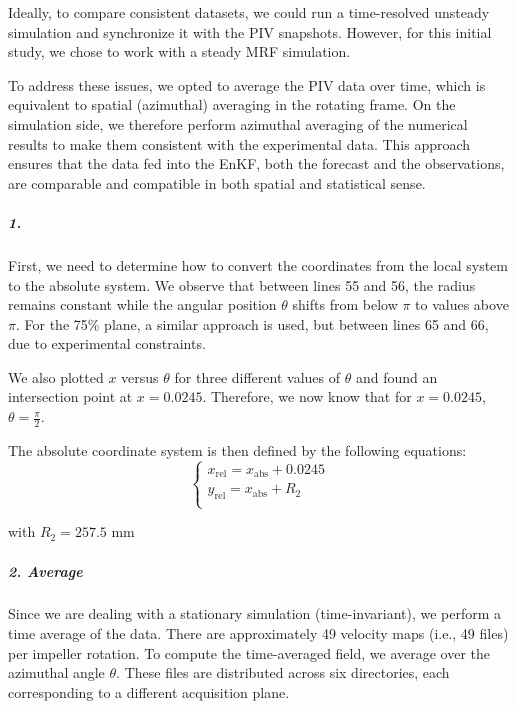 Ideally, to compare consistent datasets, we could run a time-resolved unsteady simulation and synchronize it with the PIV snapshots. However, for this initial study, we chose to work with a steady MRF simulation.

To address these issues, we opted to average the PIV data over time, which is equivalent to spatial (azimuthal) averaging in the rotating frame. On the simulation side, we therefore perform azimuthal averaging of the numerical results to make them consistent with the experimental data.
This approach ensures that the data fed into the EnKF, both the forecast and the observations, are comparable and compatible in both spatial and statistical sense.

\subparagraph{1.}

First, we need to determine how to convert the coordinates from the local system to the absolute system.
We observe that between lines 55 and 56, the radius remains constant while the angular position \(\theta\) shifts from below \(\pi\) to values above \(\pi\). 
For the 75\% plane, a similar approach is used, but between lines 65 and 66, due to experimental constraints.

We also plotted \(x\) versus \(\theta\) for three different values of \(\theta\) and found an intersection point at \(x = 0.0245\).
Therefore, we now know that for \(x = 0.0245\), \(\theta = \frac{\pi}{2}\).

The absolute coordinate system is then defined by the following equations:
\begin{equation}
    \begin{cases}
        x_{\text{rel}} = x_{\text{abs}} + 0.0245 \\
        y_{\text{rel}} = x_{\text{abs}} + R_{2} \\
    \end{cases}
\end{equation}

with $R_{2} = 257.5$ mm

\subparagraph{2. Average}

Since we are dealing with a stationary simulation (time-invariant), we perform a time average of the data.
There are approximately 49 velocity maps (i.e., 49 files) per impeller rotation. To compute the time-averaged field, we average over the azimuthal angle \(\theta\).%
These files are distributed across six directories, each corresponding to a different acquisition plane.


